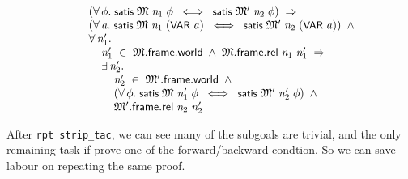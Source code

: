 \documentclass[letterpaper]{article}
\renewcommand{\HOLConst}[1]{{\textsf{\upshape\small #1}}}
\newenvironment{holmath}{\begin{displaymath}\begin{array}{l}}{\end{array}\end{displaymath}\ignorespacesafterend}
\begin{document}
\begin{holmath}
\;\;\;\;\;\;\;\;(\HOLSymConst{\HOLTokenForall{}}\HOLBoundVar{\ensuremath{\phi}}.\;\HOLConst{satis}\;\HOLBoundVar{\ensuremath{\mathfrak{M}}}\;\HOLBoundVar{n\sb{\mathrm{1}}}\;\HOLBoundVar{\ensuremath{\phi}}\;\HOLSymConst{\HOLTokenEquiv{}}\;\HOLConst{satis}\;\HOLBoundVar{\ensuremath{\mathfrak{M}'}}\;\HOLBoundVar{n\sb{\mathrm{2}}}\;\HOLBoundVar{\ensuremath{\phi}})\;\HOLSymConst{\HOLTokenImp{}}\\
\;\;\;\;\;\;\;\;(\HOLSymConst{\HOLTokenForall{}}\HOLBoundVar{a}.\;\HOLConst{satis}\;\HOLBoundVar{\ensuremath{\mathfrak{M}}}\;\HOLBoundVar{n\sb{\mathrm{1}}}\;(\HOLConst{VAR}\;\HOLBoundVar{a})\;\HOLSymConst{\HOLTokenEquiv{}}\;\HOLConst{satis}\;\HOLBoundVar{\ensuremath{\mathfrak{M}'}}\;\HOLBoundVar{n\sb{\mathrm{2}}}\;(\HOLConst{VAR}\;\HOLBoundVar{a}))\;\HOLSymConst{\HOLTokenConj{}}\\
\;\;\;\;\;\;\;\;\HOLSymConst{\HOLTokenForall{}}\HOLBoundVar{n\sb{\mathrm{1}}\sp{\prime}}.\\
\;\;\;\;\;\;\;\;\;\;\;\;\HOLBoundVar{n\sb{\mathrm{1}}\sp{\prime}}\;\HOLSymConst{\HOLTokenIn{}}\;\HOLBoundVar{\ensuremath{\mathfrak{M}}}.\HOLFieldName{frame}.\HOLFieldName{world}\;\HOLSymConst{\HOLTokenConj{}}\;\HOLBoundVar{\ensuremath{\mathfrak{M}}}.\HOLFieldName{frame}.\HOLFieldName{rel}\;\HOLBoundVar{n\sb{\mathrm{1}}}\;\HOLBoundVar{n\sb{\mathrm{1}}\sp{\prime}}\;\HOLSymConst{\HOLTokenImp{}}\\
\;\;\;\;\;\;\;\;\;\;\;\;\HOLSymConst{\HOLTokenExists{}}\HOLBoundVar{n\sb{\mathrm{2}}\sp{\prime}}.\\
\;\;\;\;\;\;\;\;\;\;\;\;\;\;\;\;\HOLBoundVar{n\sb{\mathrm{2}}\sp{\prime}}\;\HOLSymConst{\HOLTokenIn{}}\;\HOLBoundVar{\ensuremath{\mathfrak{M}'}}.\HOLFieldName{frame}.\HOLFieldName{world}\;\HOLSymConst{\HOLTokenConj{}}\\
\;\;\;\;\;\;\;\;\;\;\;\;\;\;\;\;(\HOLSymConst{\HOLTokenForall{}}\HOLBoundVar{\ensuremath{\phi}}.\;\HOLConst{satis}\;\HOLBoundVar{\ensuremath{\mathfrak{M}}}\;\HOLBoundVar{n\sb{\mathrm{1}}\sp{\prime}}\;\HOLBoundVar{\ensuremath{\phi}}\;\HOLSymConst{\HOLTokenEquiv{}}\;\HOLConst{satis}\;\HOLBoundVar{\ensuremath{\mathfrak{M}'}}\;\HOLBoundVar{n\sb{\mathrm{2}}\sp{\prime}}\;\HOLBoundVar{\ensuremath{\phi}})\;\HOLSymConst{\HOLTokenConj{}}\\
\;\;\;\;\;\;\;\;\;\;\;\;\;\;\;\;\HOLBoundVar{\ensuremath{\mathfrak{M}'}}.\HOLFieldName{frame}.\HOLFieldName{rel}\;\HOLBoundVar{n\sb{\mathrm{2}}}\;\HOLBoundVar{n\sb{\mathrm{2}}\sp{\prime}}
\end{holmath}

After \texttt{rpt strip_tac}, we can see many of the subgoals are trivial, and the only remaining task if prove one of the forward/backward condtion. So we can save labour on repeating the same proof.
\end{document}
